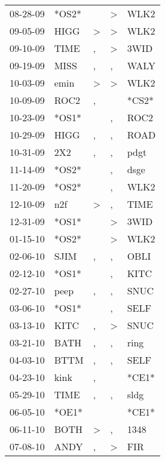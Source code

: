 \begin{supertabular}{lllll}
 08-28-09 &  *OS2* &               &  \textgreater &   WLK2 \\
 09-05-09 &   HIGG &  \textgreater &  \textgreater &   WLK2 \\
 09-10-09 &   TIME &             , &  \textgreater &   3WID \\
 09-19-09 &   MISS &             , &             , &   WALY \\
 10-03-09 &   emin &  \textgreater &  \textgreater &   WLK2 \\
 10-09-09 &   ROC2 &             , &               &  *CS2* \\
 10-23-09 &  *OS1* &               &             , &   ROC2 \\
 10-29-09 &   HIGG &             , &             , &   ROAD \\
 10-31-09 &    2X2 &             , &             , &   pdgt \\
 11-14-09 &  *OS2* &               &             , &   dsge \\
 11-20-09 &  *OS2* &               &             , &   WLK2 \\
 12-10-09 &    n2f &  \textgreater &             , &   TIME \\
 12-31-09 &  *OS1* &               &  \textgreater &   3WID \\
 01-15-10 &  *OS2* &               &  \textgreater &   WLK2 \\
 02-06-10 &   SJIM &             , &             , &   OBLI \\
 02-12-10 &  *OS1* &               &             , &   KITC \\
 02-27-10 &   peep &             , &             , &   SNUC \\
 03-06-10 &  *OS1* &               &             , &   SELF \\
 03-13-10 &   KITC &             , &  \textgreater &   SNUC \\
 03-21-10 &   BATH &             , &             , &   ring \\
 04-03-10 &   BTTM &             , &             , &   SELF \\
 04-23-10 &   kink &             , &               &  *CE1* \\
 05-29-10 &   TIME &             , &             , &   sldg \\
 06-05-10 &  *OE1* &               &               &  *CE1* \\
 06-11-10 &   BOTH &  \textgreater &             , &   1348 \\
 07-08-10 &   ANDY &             , &  \textgreater &    FIR \\

\end{supertabular}

